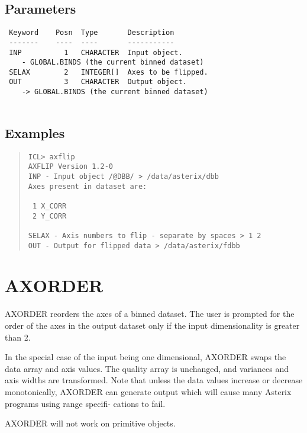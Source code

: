 \documentclass{book}
\renewcommand{\_}{{\tt\char'137}}     %
\begin{document}
\subsection{Parameters}
\begin{verbatim}
 Keyword    Posn  Type       Description
 -------    ----  ----       -----------
 INP          1   CHARACTER  Input object.
    - GLOBAL.BINDS (the current binned dataset)
 SELAX        2   INTEGER[]  Axes to be flipped.
 OUT          3   CHARACTER  Output object.
    -> GLOBAL.BINDS (the current binned dataset)
 
\end{verbatim}\subsection{Examples}
\begin{quote}\begin{verbatim}
ICL> axflip
AXFLIP Version 1.2-0
INP - Input object /@DBB/ > /data/asterix/dbb
Axes present in dataset are:
 
 1 X_CORR
 2 Y_CORR
 
SELAX - Axis numbers to flip - separate by spaces > 1 2
OUT - Output for flipped data > /data/asterix/fdbb
\end{verbatim}\end{quote}
\section{AXORDER}
AXORDER reorders the axes of a binned dataset. The user is prompted
for the order of the axes in the output dataset only if the input
dimensionality is greater than 2.
 
In the special case of the input being one dimensional, AXORDER
swaps the data array and axis values. The quality array is unchanged,
and variances and axis widths are transformed. Note that unless the
data values increase or decrease monotonically, AXORDER can generate
output which will cause many Asterix programs using range specifi-
cations to fail.
 
AXORDER will not work on primitive objects.
 
\end{document}

